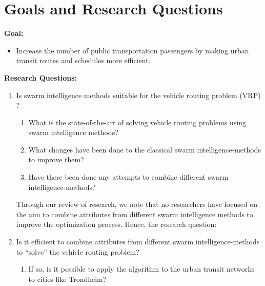 \section{Goals and Research Questions}

\textbf{Goal:}
\begin{itemize}
\item Increase the number of public transportation passengers by making urban transit routes and schedules more efficient.
\end{itemize}
\textbf{Research Questions:}
\begin{enumerate}
  \item Is swarm intelligence methods suitable for the vehicle routing problem (VRP) ?
    \begin{enumerate}
    \item What is the state-of-the-art of solving vehicle routing problems using swarm intelligence methods?
    \item What changes have been done to the classical swarm intelligence-methods to improve them?
    \item Have there been done any attempts to combine different swarm intelligence-methods?
  \end{enumerate}

Through our review of research, we note that no researchers have focused on the aim to combine attributes from different swarm intelligence methods to improve the optimization process. Hence, the research question:

\item Is it efficient to combine attributes from different swarm intelligence-methods to ``solve'' the vehicle routing problem?
    \begin{enumerate}
    \item If so, is it possible to apply the algorithm to the urban transit networks to cities like Trondheim?
  \end{enumerate}
\end{enumerate}